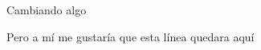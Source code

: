 \documentclass{article}
\begin{document}
Cambiando algo

Pero a mí me gustaría que esta línea quedara aquí
\end{document}
